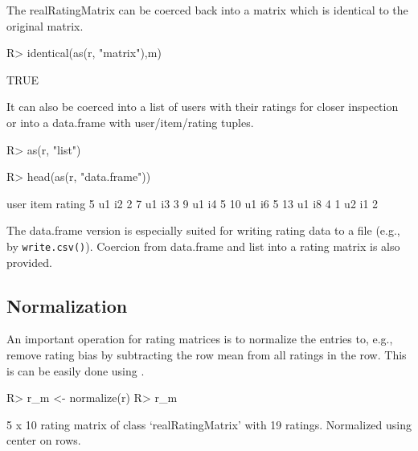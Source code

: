 \documentclass[nojss]{jss}
\newcommand{\func}[1]{\mbox{\texttt{#1()}}}
\begin{document}
The realRatingMatrix can be coerced back into a matrix which is
identical to the original matrix.
\begin{Schunk}
\begin{Sinput}
R> identical(as(r, "matrix"),m)
\end{Sinput}
\begin{Soutput}
[1] TRUE
\end{Soutput}
\end{Schunk}


It can also be coerced into a list
of users with their ratings for closer inspection
or
into a data.frame with user/item/rating tuples.
\begin{Schunk}
\begin{Sinput}
R> as(r, "list")
\end{Sinput}
\begin{Sinput}
R> head(as(r, "data.frame"))
\end{Sinput}
\begin{Soutput}
   user item rating
5    u1   i2      2
7    u1   i3      3
9    u1   i4      5
10   u1   i6      5
13   u1   i8      4
1    u2   i1      2
\end{Soutput}
\end{Schunk}

The data.frame version is especially suited for writing rating data to a
file (e.g., by \func{write.csv}).
Coercion from data.frame and list into a rating matrix is also provided.

\subsection{Normalization}
An important operation for rating matrices is to normalize the entries
to, e.g., remove rating bias by subtracting the row mean from
all ratings in the row. This is can be easily done using
.

\begin{Schunk}
\begin{Sinput}
R> r_m <- normalize(r)
R> r_m
\end{Sinput}
\begin{Soutput}
5 x 10 rating matrix of class ‘realRatingMatrix’ with 19 ratings.
Normalized using center on rows.
\end{Soutput}
\end{Schunk}
\end{document}
